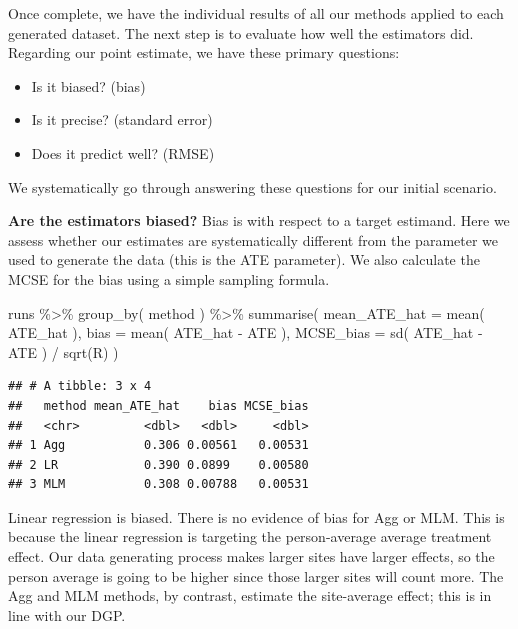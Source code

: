 \documentclass[
]{book}
\newenvironment{Shaded}{\begin{snugshade}}{\end{snugshade}}
\newcommand{\AttributeTok}[1]{\textcolor[rgb]{0.77,0.63,0.00}{#1}}
\newcommand{\FunctionTok}[1]{\textcolor[rgb]{0.00,0.00,0.00}{#1}}
\newcommand{\NormalTok}[1]{#1}
\newcommand{\SpecialCharTok}[1]{\textcolor[rgb]{0.00,0.00,0.00}{#1}}
\providecommand{\tightlist}{%
  \setlength{\itemsep}{0pt}\setlength{\parskip}{0pt}}
\begin{document}
Once complete, we have the individual results of all our methods applied to each generated dataset.
The next step is to evaluate how well the estimators did.
Regarding our point estimate, we have these primary questions:

\begin{itemize}
\tightlist
\item
  Is it biased? (bias)
\item
  Is it precise? (standard error)
\item
  Does it predict well? (RMSE)
\end{itemize}

We systematically go through answering these questions for our initial scenario.

\textbf{Are the estimators biased?}
Bias is with respect to a target estimand.
Here we assess whether our estimates are systematically different from the parameter we used to generate the data (this is the ATE parameter).
We also calculate the MCSE for the bias using a simple sampling formula.

\begin{Shaded}
\begin{Highlighting}[]
\NormalTok{runs }\SpecialCharTok{\%\textgreater{}\%} 
  \FunctionTok{group\_by}\NormalTok{( method ) }\SpecialCharTok{\%\textgreater{}\%}
  \FunctionTok{summarise}\NormalTok{( }
    \AttributeTok{mean\_ATE\_hat =} \FunctionTok{mean}\NormalTok{( ATE\_hat ),}
    \AttributeTok{bias =} \FunctionTok{mean}\NormalTok{( ATE\_hat }\SpecialCharTok{{-}}\NormalTok{ ATE ),}
    \AttributeTok{MCSE\_bias =} \FunctionTok{sd}\NormalTok{( ATE\_hat }\SpecialCharTok{{-}}\NormalTok{ ATE ) }\SpecialCharTok{/} \FunctionTok{sqrt}\NormalTok{(R)}
\NormalTok{  )}
\end{Highlighting}
\end{Shaded}

\begin{verbatim}
## # A tibble: 3 x 4
##   method mean_ATE_hat    bias MCSE_bias
##   <chr>         <dbl>   <dbl>     <dbl>
## 1 Agg           0.306 0.00561   0.00531
## 2 LR            0.390 0.0899    0.00580
## 3 MLM           0.308 0.00788   0.00531
\end{verbatim}

Linear regression is biased. There is no evidence of bias for Agg or MLM.
This is because the linear regression is targeting the person-average average treatment effect.
Our data generating process makes larger sites have larger effects, so the person average is going to be higher since those larger sites will count more.
The Agg and MLM methods, by contrast, estimate the site-average effect; this is in line with our DGP.
\end{document}
